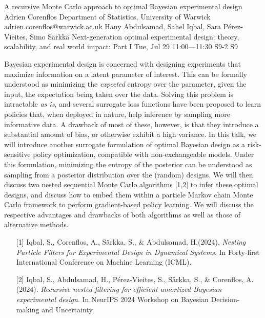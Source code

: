 \begin{talk}
  {A recursive Monte Carlo approach to optimal Bayesian experimental design}%
  {Adrien Corenflos}%
  {Department of Statistics, University of Warwick}%
  {adrien.corenflos@warwick.ac.uk}%
  {Hany Abdulsamad, Sahel Iqbal, Sara P\'erez-Vieites, Simo S\"arkk\"a}%
  {Next-generation optimal experimental design: theory, scalability, and real world impact: Part I}%
  {Tue, Jul 29 11:00---11:30}%
  {S9-2}%
  {S9}%
    
   
    Bayesian experimental design is concerned with designing experiments that maximize information on a latent parameter of interest. 
    This can be formally understood as minimizing the \emph{expected} entropy over the parameter, given the input, the expectation being taken over the data.
    Solving this problem is intractable \emph{as is}, and several surrogate loss functions have been proposed to learn policies that, when deployed in nature, help inference by sampling more informative data.
    A drawback of most of these, however, is that they introduce a substantial amount of bias, or otherwise exhibit a high variance.
    In this talk, we will introduce another surrogate formulation of optimal Bayesian design as a risk-sensitive policy optimization, compatible with non-exchangeable models.
    Under this formulation, minimizing the entropy of the posterior can be understood as sampling from a posterior distribution over the (random) designs.
    We will then discuss two nested sequential Monte Carlo algorithms [1,2] to infer these optimal designs, and discuss how to embed them within a particle Markov chain Monte Carlo framework to perform gradient-based policy learning. 
    We will discuss the respective advantages and drawbacks of both algorithms as well as those of alternative methods.
\medskip


\begin{enumerate}
 \item[{[1]}]Iqbal, S., Corenflos, A., S\"arkka, S., \&  Abdulsamad, H.(2024). {\it Nesting Particle Filters for Experimental Design in Dynamical Systems}. In Forty-first International Conference on Machine Learning (ICML).
 \item[{[2]}] Iqbal, S., Abdulsamad, H., P\'erez-Vieites, S., S\"arkka, S., \& Corenflos, A. (2024). {\it Recursive nested filtering for efficient amortized Bayesian experimental design}. In NeurIPS 2024 Workshop on Bayesian Decision-making and Uncertainty.
\end{enumerate}

\end{talk}

